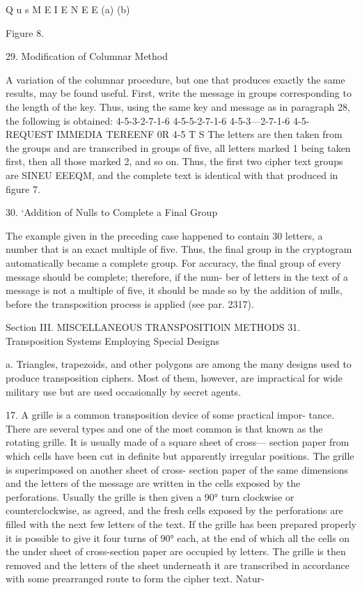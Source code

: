  

 

Q u s
M E I
E N
E E
(a) (b)

Figure 8.

29. Modiﬁcation of Columnar Method

A variation of the columnar procedure, but one that produces exactly
the same results, may be found useful. First, write the message in groups
corresponding to the length of the key. Thus, using the same key and
message as in paragraph 28, the following is obtained:
4-5-3-2-7-1-6 4-5-5-2-7-1-6 4-5-3—2-7-1-6 4-5-
REQUEST IMMEDIA TEREENF 0R
4-5
T S
The letters are then taken from the groups and are transcribed in groups
of ﬁve, all letters marked 1 being taken ﬁrst, then all those marked 2, and
so on. Thus, the ﬁrst two cipher text groups are SINEU EEEQM,
and the complete text is identical with that produced in ﬁgure 7.

30. ‘Addition of Nulls to Complete a Final Group

The example given in the preceding case happened to contain 30 letters,
a number that is an exact multiple of ﬁve. Thus, the ﬁnal group in the
cryptogram automatically became a complete group. For accuracy, the
ﬁnal group of every message should be complete; therefore, if the num-
ber of letters in the text of a message is not a multiple of ﬁve, it should
be made so by the addition of nulls, before the transposition process
is applied (see par. 2317).

Section III. MISCELLANEOUS TRANSPOSITIOlN METHODS
31. Transposition Systems Employing Special Designs

a. Triangles, trapezoids, and other polygons are among the many
designs used to produce transposition ciphers. Most of them, however,
are impractical for wide military use but are used occasionally by secret
agents.

17. A grille is a common transposition device of some practical impor-
tance. There are several types and one of the most common is that known
as the rotating grille. It is usually made of a square sheet of cross—
section paper from which cells have been cut in deﬁnite but apparently
irregular positions. The grille is superimposed on another sheet of cross-
section paper of the same dimensions and the letters of the message are
written in the cells exposed by the perforations. Usually the grille is
then given a 90° turn clockwise or counterclockwise, as agreed, and the
fresh cells exposed by the perforations are ﬁlled with the next few letters
of the text. If the grille has been prepared properly it is possible to give it
four turns of 90° each, at the end of which all the cells on the under
sheet of cross-section paper are occupied by letters. The grille is then
removed and the letters of the sheet underneath it are transcribed in
accordance with some prearranged route to form the cipher text. Natur-



